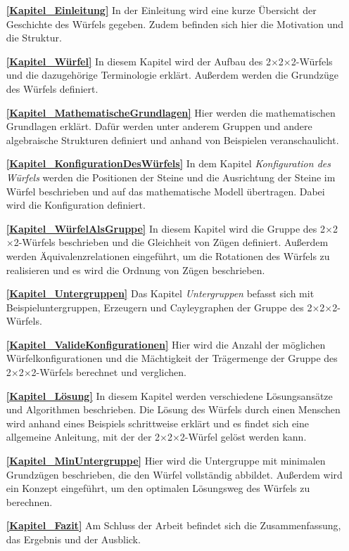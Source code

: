 \documentclass[12pt,a4paper, usenames, dvipsnames]{article}
\theoremstyle{mystyle}
\theoremstyle{definition}
\newcommand{\Ttwo}{2$\times$2$\times$2-}
\begin{document}
\begin{itemize}
\item[\textbf{\ref{Kapitel_Einleitung}}] In der Einleitung wird eine kurze Übersicht der Geschichte des Würfels gegeben. Zudem befinden sich hier die Motivation und die Struktur.

\item[\textbf{\ref{Kapitel_Würfel}}] In diesem Kapitel wird der Aufbau des \Ttwo Würfels und die dazugehörige Terminologie erklärt. Außerdem werden die Grundzüge des Würfels definiert.

\item[\textbf{\ref{Kapitel_MathematischeGrundlagen}}] Hier werden die mathematischen Grundlagen erklärt. Dafür werden unter anderem Gruppen und andere algebraische Strukturen definiert und anhand von Beispielen veranschaulicht.

\item[\textbf{\ref{Kapitel_KonfigurationDesWürfels}}] In dem Kapitel \textit{Konfiguration des Würfels} werden die Positionen der Steine und die Ausrichtung der Steine im Würfel beschrieben und auf das mathematische Modell übertragen. Dabei wird die Konfiguration definiert. 

\item[\textbf{\ref{Kapitel_WürfelAlsGruppe}}] In diesem Kapitel wird die Gruppe des \Ttwo Würfels beschrieben und die Gleichheit von Zügen definiert. Außerdem werden Äquivalenzrelationen eingeführt, um die Rotationen des Würfels zu realisieren und es wird die Ordnung von Zügen beschrieben.

\item[\textbf{\ref{Kapitel_Untergruppen}}] Das Kapitel \textit{Untergruppen} befasst sich mit Beispieluntergruppen, Erzeugern und Cayleygraphen der Gruppe des \Ttwo Würfels.

\item[\textbf{\ref{Kapitel_ValideKonfigurationen}}] Hier wird die Anzahl der möglichen Würfelkonfigurationen und die Mächtigkeit der Trägermenge der Gruppe des \Ttwo Würfels berechnet und verglichen.

\item[\textbf{\ref{Kapitel_Lösung}}] In diesem Kapitel werden verschiedene Lösungsansätze und Algorithmen beschrieben. Die Lösung des Würfels durch einen Menschen wird anhand eines Beispiels schrittweise erklärt und es findet sich eine allgemeine Anleitung, mit der der \Ttwo Würfel gelöst werden kann.

\item[\textbf{\ref{Kapitel_MinUntergruppe}}] Hier wird die Untergruppe mit minimalen Grundzügen beschrieben, die den Würfel vollständig abbildet. Außerdem wird ein Konzept eingeführt, um den optimalen Lösungsweg des Würfels zu berechnen.  

\item[\textbf{\ref{Kapitel_Fazit}}] Am Schluss der Arbeit befindet sich die Zusammenfassung, das Ergebnis und der Ausblick.

\end{itemize}
\end{document}

